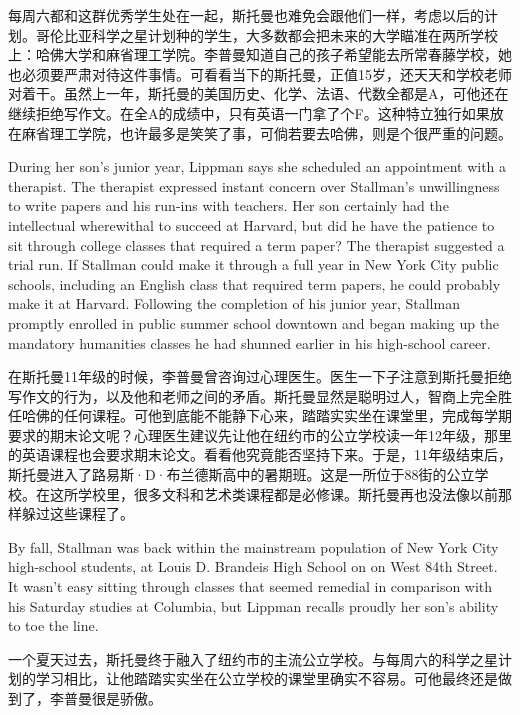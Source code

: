 \ifdefined\chs
每周六都和这群优秀学生处在一起，斯托曼也难免会跟他们一样，考虑以后的计划。哥伦比亚科学之星计划种的学生，大多数都会把未来的大学瞄准在两所学校上：哈佛大学和麻省理工学院。李普曼知道自己的孩子希望能去所常春藤学校，她也必须要严肃对待这件事情。可看看当下的斯托曼，正值15岁，还天天和学校老师对着干。虽然上一年，斯托曼的美国历史、化学、法语、代数全都是A，可他还在继续拒绝写作文。在全A的成绩中，只有英语一门拿了个F。这种特立独行如果放在麻省理工学院，也许最多是笑笑了事，可倘若要去哈佛，则是个很严重的问题。
\fi

\ifdefined\eng
During her son's junior year, Lippman says she scheduled an appointment with a therapist. The therapist expressed instant concern over Stallman's unwillingness to write papers and his run-ins with teachers. Her son certainly had the intellectual wherewithal to succeed at Harvard, but did he have the patience to sit through college classes that required a term paper? The therapist suggested a trial run. If Stallman could make it through a full year in New York City public schools, including an English class that required term papers, he could probably make it at Harvard. Following the completion of his junior year, Stallman promptly enrolled in public summer school downtown and began making up the mandatory humanities classes he had shunned earlier in his high-school career.
\fi

\ifdefined\chs
在斯托曼11年级的时候，李普曼曾咨询过心理医生。医生一下子注意到斯托曼拒绝写作文的行为，以及他和老师之间的矛盾。斯托曼显然是聪明过人，智商上完全胜任哈佛的任何课程。可他到底能不能静下心来，踏踏实实坐在课堂里，完成每学期要求的期末论文呢？心理医生建议先让他在纽约市的公立学校读一年12年级，那里的英语课程也会要求期末论文。看看他究竟能否坚持下来。于是，11年级结束后，斯托曼进入了路易斯·D·布兰德斯高中的暑期班。这是一所位于88街的公立学校。在这所学校里，很多文科和艺术类课程都是必修课。斯托曼再也没法像以前那样躲过这些课程了。
\fi

\ifdefined\eng
By fall, Stallman was back within the mainstream population of New York City high-school students, at Louis D. Brandeis High School on on West 84th Street. It wasn't easy sitting through classes that seemed remedial in comparison with his Saturday studies at Columbia, but Lippman recalls proudly her son's ability to toe the line.
\fi

\ifdefined\chs
一个夏天过去，斯托曼终于融入了纽约市的主流公立学校。与每周六的科学之星计划的学习相比，让他踏踏实实坐在公立学校的课堂里确实不容易。可他最终还是做到了，李普曼很是骄傲。
\fi


